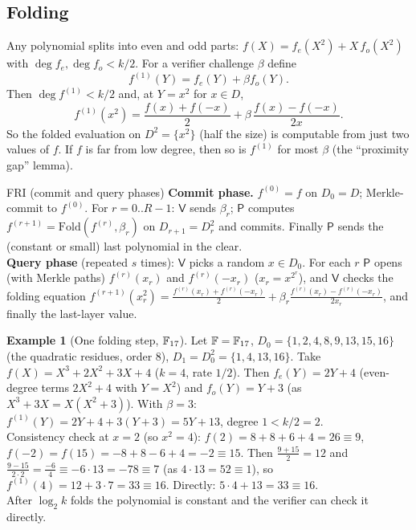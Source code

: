 \documentclass[11pt,a4paper]{report}
\theoremstyle{plain}
\theoremstyle{definition}
\newtheorem{example}[theorem]{Example}
\theoremstyle{remark}
\newcommand{\Prv}{\mathsf{P}}\newcommand{\Ver}{\mathsf{V}}
\begin{document}
\subsection{Folding}
Any polynomial splits into even and odd parts: $f(X)=f_e(X^2)+X\,f_o(X^2)$ with $\deg f_e,\deg f_o<k/2$. For a verifier challenge $\beta$ define
\[f^{(1)}(Y)=f_e(Y)+\beta f_o(Y).\]
Then $\deg f^{(1)}<k/2$ and, at $Y=x^2$ for $x\in D$,
\[f^{(1)}(x^2)=\frac{f(x)+f(-x)}2+\beta\,\frac{f(x)-f(-x)}{2x}.\]
So the folded evaluation on $D^2=\{x^2\}$ (half the size) is computable from just two values of $f$. If $f$ is far from low degree, then so is $f^{(1)}$ for most $\beta$ (the ``proximity gap'' lemma).
\begin{algorithm}[label=pr:fri]{FRI (commit and query phases)}
\textbf{Commit phase.} $f^{(0)}=f$ on $D_0=D$; Merkle-commit to $f^{(0)}$. For $r=0..R-1$: $\Ver$ sends $\beta_r$; $\Prv$ computes $f^{(r+1)}=\mathrm{Fold}(f^{(r)},\beta_r)$ on $D_{r+1}=D_r^2$ and commits. Finally $\Prv$ sends the (constant or small) last polynomial in the clear.\\
\textbf{Query phase} (repeated $s$ times): $\Ver$ picks a random $x\in D_0$. For each $r$ $\Prv$ opens (with Merkle paths) $f^{(r)}(x_r)$ and $f^{(r)}(-x_r)$ ($x_r=x^{2^r}$), and $\Ver$ checks the folding equation $f^{(r+1)}(x_r^2)=\frac{f^{(r)}(x_r)+f^{(r)}(-x_r)}2+\beta_r\frac{f^{(r)}(x_r)-f^{(r)}(-x_r)}{2x_r}$, and finally the last-layer value.
\end{algorithm}
\begin{center}
\end{center}
\begin{example}[One folding step, $\mathbb{F}_{17}$]
Let $\mathbb{F}=\mathbb{F}_{17}$, $D_0=\{1,2,4,8,9,13,15,16\}$ (the quadratic residues, order 8), $D_1=D_0^2=\{1,4,13,16\}$. Take $f(X)=X^3+2X^2+3X+4$ ($k=4$, rate $1/2$). Then $f_e(Y)=2Y+4$ (even-degree terms $2X^2+4$ with $Y=X^2$) and $f_o(Y)=Y+3$ (as $X^3+3X=X(X^2+3)$). With $\beta=3$: $f^{(1)}(Y)=2Y+4+3(Y+3)=5Y+13$, degree $1<k/2=2$.\\
Consistency check at $x=2$ (so $x^2=4$): $f(2)=8+8+6+4=26\equiv9$, $f(-2)=f(15)=-8+8-6+4=-2\equiv15$. Then $\frac{9+15}2=12$ and $\frac{9-15}{2\cdot2}=\frac{-6}{4}\equiv-6\cdot13=-78\equiv7$ (as $4\cdot13=52\equiv1$), so $f^{(1)}(4)=12+3\cdot7=33\equiv16$. Directly: $5\cdot4+13=33\equiv16$. \checkmark\\
After $\log_2k$ folds the polynomial is constant and the verifier can check it directly.
\end{example}
\end{document}
